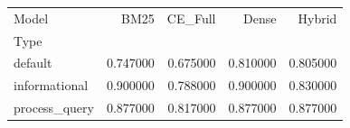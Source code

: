 \begin{tabular}{lrrrr}
\toprule
Model & BM25 & CE_Full & Dense & Hybrid \\
Type &  &  &  &  \\
\midrule
default & 0.747000 & 0.675000 & 0.810000 & 0.805000 \\
informational & 0.900000 & 0.788000 & 0.900000 & 0.830000 \\
process_query & 0.877000 & 0.817000 & 0.877000 & 0.877000 \\
\bottomrule
\end{tabular}

